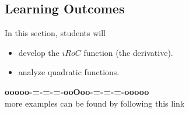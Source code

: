 \documentclass{ximera}
\begin{document}
\subsection*{Learning Outcomes}

\begin{sectionOutcomes}
In this section, students will 

\begin{itemize}
\item develop the $iRoC$ function (the derivative).
\item analyze quadratic functions.
\end{itemize}
\end{sectionOutcomes}















\begin{center}
\textbf{\textcolor{green!50!black}{ooooo-=-=-=-ooOoo-=-=-=-ooooo}} \\

more examples can be found by following this link\\ 

\end{center}
\end{document}
